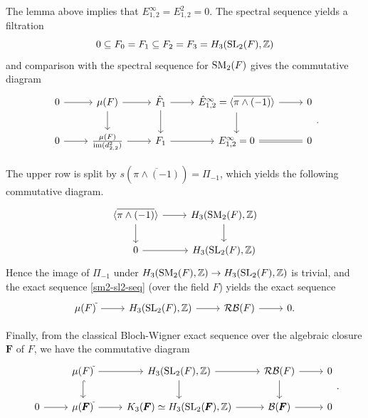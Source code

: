 \documentclass[11pt]{amsart}
\theoremstyle{definition}
\theoremstyle{plain}
\theoremstyle{definition}
\numberwithin{equation}{section}
\newcommand{\z}{\mathbb{Z}}
\newcommand{\BB}{\mathcal{B}}
\newcommand{\RB}{\mathcal{RB}}
\newcommand{\lan}{\langle}
\newcommand{\ran}{\rangle}
\newcommand{\SL}{\mathit{{\rm SL}}}
\newcommand{\SM}{\mathit{{\rm SM}}}
\newcommand{\im}{{\rm im}}
\begin{document}
	The lemma above implies that $E^{\infty}_{1,2}=E^2_{1,2}=0$. The spectral sequence yields a filtration
	\[
	0\subseteq F_0 = F_1\subseteq F_2 = F_3=H_3(\SL_2(F),\z)
	\]
	and comparison with the spectral sequence for $\SM_2(F)$ gives the commutative diagram
	\[
	\begin{tikzcd}
		0\ar[r] & \mu(F)\ar[r]\ar[d] & \hat{F}_1 \ar[r]\ar[d] & \hat{E}^{\infty}_{1,2}=\lan\overline{\pi\wedge(-1)}\ran\ar[r]\ar[d] & 0\\
		0\ar[r] & \frac{\mu(F)}{\im(d^2_{2,2})}\ar[r] & F_1 \ar[r] & E^{\infty}_{1,2}=0\ar[r,equal] & 0
	\end{tikzcd}.
	\]
	
	The upper row is split by $s(\overline{\pi\wedge(-1)})=\Pi_{-1}$, which yields the following commutative diagram. 
	\[
	\begin{tikzcd}
		\lan\overline{\pi\wedge(-1)}\ran\ar[r]\ar[d] & H_3(\SM_2(F),\z)\ar[d]\\
		0\ar[r] & H_3(\SL_2(F),\z)
	\end{tikzcd}
	\]
	Hence the image of $\Pi_{-1}$ under $H_3(\SM_2(F),\z)\to H_3(\SL_2(F),\z)$ is trivial, and the exact sequence \eqref{sm2-sl2-seq} (over the field $F$) yields the exact sequence
	\[
	\begin{tikzcd}
		\mu(F)^{\tilde{}}\ar[r] & H_3(\SL_2(F),\z)\ar[r] & \RB(F)\ar[r] & 0.
	\end{tikzcd}
	\]
	
	Finally, from the classical Bloch-Wigner exact sequence over the algebraic closure $\pmb{F}$ of $F$, we have the commutative diagram
	\[
	\begin{tikzcd}
		&\mu(F)^{\tilde{}}\ar[r]\ar[d,hook] & H_3(\SL_2(F),\z)\ar[r]\ar[d] & \RB(F)\ar[r]\ar[d] & 0\\
		0 \ar[r] & \mu(\pmb{F})^{\tilde{}}\ar[r] & K_3(\pmb{F})\simeq H_3(\SL_2(\pmb{F}),\z)\ar[r] & \BB(\pmb{F})\ar[r] & 0
	\end{tikzcd}.
	\]
	
\end{document}
